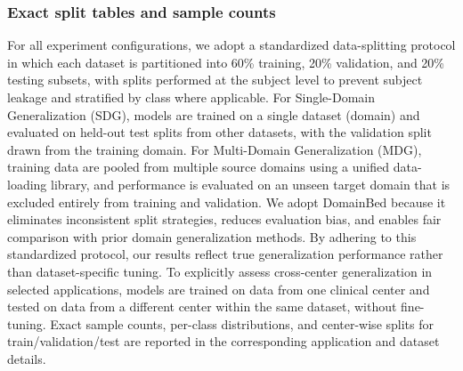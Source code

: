 \documentclass{article}
\begin{document}
\subsubsection{Exact split tables and sample counts}
\label{app:splits_counts}
For all experiment configurations, we adopt a standardized data-splitting protocol in which each dataset is partitioned into
60\% training, 20\% validation, and 20\% testing subsets, with splits performed at the subject level to prevent subject leakage
and stratified by class where applicable. For Single-Domain Generalization (SDG), models are trained on a single dataset
(domain) and evaluated on held-out test splits from other datasets, with the validation split drawn from the training domain.
For Multi-Domain Generalization (MDG), training data are pooled from multiple source domains using a unified data-loading
library, and performance is evaluated on an unseen target domain that is excluded entirely from training and validation. We adopt DomainBed because it eliminates
inconsistent split strategies, reduces evaluation bias, and enables fair comparison with prior domain
generalization methods. By adhering to this standardized protocol, our results reflect true generalization
performance rather than dataset-specific tuning.
To explicitly assess cross-center generalization in selected applications, models are trained on data from one clinical center
and tested on data from a different center within the same dataset, without fine-tuning. Exact sample counts, per-class
distributions, and center-wise splits for train/validation/test are reported in the corresponding application and dataset details.
\end{document}
